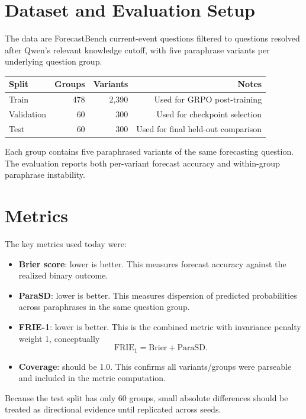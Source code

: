 \documentclass[11pt]{article}
\begin{document}
\section{Dataset and Evaluation Setup}

The data are ForecastBench current-event questions filtered to questions
resolved after Qwen's relevant knowledge cutoff, with five paraphrase variants
per underlying question group.

\begin{center}
\begin{tabular}{lrrr}
\toprule
Split & Groups & Variants & Notes \\
\midrule
Train & 478 & 2,390 & Used for GRPO post-training \\
Validation & 60 & 300 & Used for checkpoint selection \\
Test & 60 & 300 & Used for final held-out comparison \\
\bottomrule
\end{tabular}
\end{center}

Each group contains five paraphrased variants of the same forecasting question.
The evaluation reports both per-variant forecast accuracy and within-group
paraphrase instability.

\section{Metrics}

The key metrics used today were:

\begin{itemize}
  \item \textbf{Brier score}: lower is better. This measures forecast accuracy
  against the realized binary outcome.
  \item \textbf{ParaSD}: lower is better. This measures dispersion of predicted
  probabilities across paraphrases in the same question group.
  \item \textbf{FRIE-1}: lower is better. This is the combined metric with
  invariance penalty weight 1, conceptually
  \[
    \mathrm{FRIE}_1 = \mathrm{Brier} + \mathrm{ParaSD}.
  \]
  \item \textbf{Coverage}: should be 1.0. This confirms all variants/groups were
  parseable and included in the metric computation.
\end{itemize}

Because the test split has only 60 groups, small absolute differences should be
treated as directional evidence until replicated across seeds.
\end{document}
